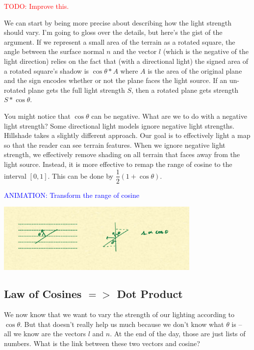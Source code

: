 \documentclass{article}
\newcommand\todo[1]{\textcolor{red}{TODO: #1}}
\newcommand\animation[1]{\textcolor{blue}{ANIMATION: #1}}
\begin{document}
\todo{Improve this.}

We can start by being more precise about describing how the light strength should vary.
I'm going to gloss over the details, but here's the gist of the argument.
If we represent a small area of the terrain as a rotated square, the angle between the surface normal $n$ and the vector $l$ (which is the negative of the light direction) 
relies on the fact that (with a directional light) the signed area of a rotated square's shadow is $\cos \theta * A$ where $A$ is the area of the original plane and the sign encodes whether or not the plane faces the light source.
If an un-rotated plane gets the full light strength $S$, then a rotated plane gets strength $S * \cos \theta$.

You might notice that $\cos \theta$ can be negative.
What are we to do with a negative light strength?
Some directional light models ignore negative light strengths.
Hillshade takes a slightly different approach.
Our goal is to effectively light a map so that the reader can see terrain features.
When we ignore negative light strength, we effectively remove shading on all terrain that faces away from the light source.
Instead, it is more effective to remap the range of cosine to the interval $[0, 1]$.
This can be done by $\dfrac{1}{2}(1 + \cos \theta)$.
 
\animation{Transform the range of cosine}

\begin{center}
	\includegraphics[width=0.75\textwidth,frame]{assets/cosine.jpg}
\end{center}

\subsection{Law of Cosines $=>$ Dot Product}

We now know that we want to vary the strength of our lighting according to $\cos \theta$.
But that doesn't really help us much because we don't know what $\theta$ is -- all we know are the vectors $l$ and $n$.
At the end of the day, those are just lists of numbers.
What is the link between these two vectors and cosine?
\end{document}
